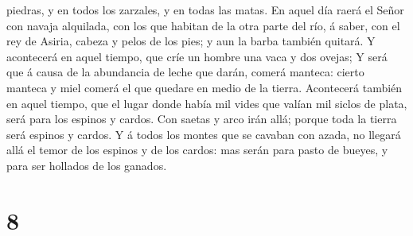 piedras, y en todos los zarzales, y en todas las matas.  En
aquel día raerá el Señor con navaja alquilada, con los que habitan de la
otra parte del río, á saber, con el rey de Asiria, cabeza y pelos de los
pies; y aun la barba también quitará.  Y acontecerá en
aquel tiempo, que críe un hombre una vaca y dos ovejas;  Y
será que á causa de la abundancia de leche que darán, comerá manteca:
cierto manteca y miel comerá el que quedare en medio de la tierra.
 Acontecerá también en aquel tiempo, que el lugar donde
había mil vides que valían mil siclos de plata, será para los espinos y
cardos.  Con saetas y arco irán allá; porque toda la tierra
será espinos y cardos.  Y á todos los montes que se cavaban
con azada, no llegará allá el temor de los espinos y de los cardos: mas
serán para pasto de bueyes, y para ser hollados de los ganados.

\hypertarget{section-7}{%
\section{8}\label{section-7}}

